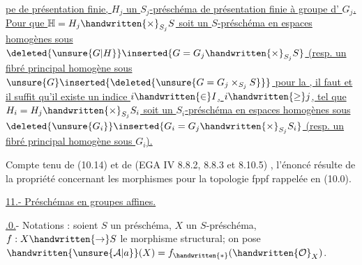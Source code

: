 \uline{pe de présentation finie, $H_j$ un $S_j$-préschéma de présentation finie à groupe d' $G_j$. Pour que $\mathbb{H}=H_j\handwritten{\times}_{S_j}S$ soit un $S$-préschéma en espaces homogènes sous $\deleted{\unsure{G|H}}\inserted{G=G_j\handwritten{\times}_{S_j}S}$ (resp. un fibré principal homogène sous $\unsure{G}\inserted{\deleted{\unsure{G=G_j\times_{S_j}S}}}$\unsure{)} pour la }\uline{, il faut et il suffit qu'il existe un indice $i\handwritten{\in}I$, $i\handwritten{\geq}j$, tel que $H_i=H_j\handwritten{\times}_{S_j}S_i$ soit un $S_i$-préschéma en espaces homogènes sous $\deleted{\unsure{G_i}}\inserted{G_i=G_j\handwritten{\times}_{S_j}S_i}$ (resp. un fibré principal homogène sous $G_i$).}

Compte tenu de (10.14) et de (EGA IV 8.8.2, 8.8.3 et 8.10.5) ,  l'énoncé résulte de la propriété concernant les morphismes  pour la topologie fppf rappelée en (10.0).

\uline{11.- Préschémas en groupes affines.}

\uline{.0.}- Notations : soient $S$ un préschéma, $X$ un $S$-préschéma, $f:X\handwritten{\to}S$ le morphisme structural; on pose $\handwritten{\unsure{\mathcal{A}|a}}(X)=f_{\handwritten{*}}(\handwritten{\mathcal{O}}_X)$.

